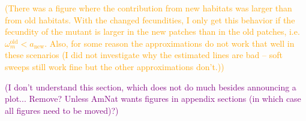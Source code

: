 \documentclass[11pt]{article}
\newcommand{\florence}[1]{\textcolor{purple}{(#1)}} %
\newcommand{\pete}[1]{\textcolor{orange}{(#1)}}
\begin{document}

\pete{There was a figure where the contribution from new habitats was larger than from old habitats. With the changed fecundities, I only get this behavior if the fecundity of the mutant is larger in the new patches than in the old patches, i.e. $\omega^\text{old}_m < a_{\text{new}}$. Also, for some reason the approximations do not work that well in these scenarios (I did not investigate why the estimated lines are bad -- soft sweeps still work fine but the other approximations don't.)}

\florence{I don't understand this section, which does not do much besides announcing a plot... Remove? Unless AmNat wants figures in appendix sections (in which case all figures need to be moved)?}

\newpage
\renewcommand{\theequation}{D\arabic{equation}}
\setcounter{equation}{0}  %
\end{document}
